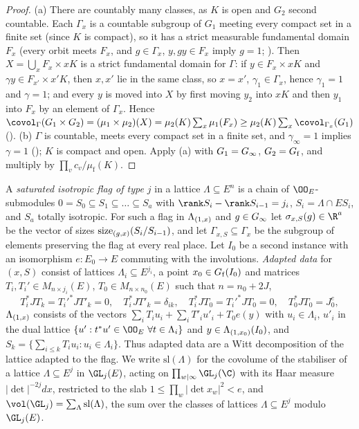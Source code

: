 \begin{proof}
(a) There are countably many classes, as $K$ is open and $G_2$ second countable. Each $\Gamma_x$ is a countable subgroup of $G_1$
meeting every compact set in a finite set (since $K$ is compact), so it has a strict measurable fundamental domain $F_x$ (every
orbit meets $F_x$, and $g\in\Gamma_x$, $y,gy\in F_x$ imply $g=1$; ). Then
$X=\bigcup_xF_x\times xK$ is a strict fundamental domain for $\Gamma$: if $y\in F_x\times xK$ and $\gamma y\in F_{x'}\times x'K$,
then $x,x'$ lie in the same class, so $x=x'$, $\gamma_1\in\Gamma_x$, hence $\gamma_1=1$ and $\gamma=1$; and every $y$ is moved into $X$
by first moving $y_2$ into $xK$ and then $y_1$ into $F_x$ by an element of $\Gamma_x$. Hence
$\covol_\Gamma(G_1\times G_2)=(\mu_1\times\mu_2)(X)=\mu_2(K)\sum_x\mu_1(F_x)\ge\mu_2(K)\sum_x\covol_{\Gamma_x}(G_1)$
().
(b) $\Gamma$ is countable, meets every compact set in a finite set, and $\gamma_\infty=1$ implies $\gamma=1$
(); $K$ is compact and open. Apply (a) with
$G_1=G_\infty$, $G_2=G_{\mathrm f}$, and multiply by $\prod_vc_v/\mu_{\mathrm f}(K)$.
\end{proof}

A \emph{saturated isotropic flag of type $j$} in a lattice $\Lambda\subseteq E^n$ is a chain of $\OO_E$-submodules
$0=S_0\subseteq S_1\subseteq\dots\subseteq S_a$ with $\rank S_i-\rank S_{i-1}=j_i$, $S_i=\Lambda\cap ES_i$, and $S_a$ totally
isotropic. For such a flag in $\Lambda_{(1,x)}$ and $g\in G_\infty$ let $\sigma_{x,S}(g)\in\R^a$ be the vector of sizes
$\operatorname{size}_{(g,x)}(S_i/S_{i-1})$, and let $\Gamma_{x,S}\subseteq\Gamma_x$ be the subgroup of elements preserving the flag at every
real place. Let $I_0$ be a second instance with an isomorphism $e:E_0\to E$ commuting with the involutions.
\emph{Adapted data} for $(x,S)$ consist of lattices $\Lambda_i\subseteq E^{j_i}$, a point $x_0\in G_{\mathrm f}(I_0)$ and matrices
$T_i,T_i'\in M_{n\times j_i}(E)$, $T_0\in M_{n\times n_0}(E)$ such that $n=n_0+2J$,
\[
T_i^*JT_k=T_i'^*JT'_k=0,\quad T_i^*JT'_k=\delta_{ik},\quad T_i^*JT_0=T_i'^*JT_0=0,\quad T_0^*JT_0=J_0^e,
\]
$\Lambda_{(1,x)}$ consists of the vectors $\sum_iT_iu_i+\sum_iT'_iu'_i+T_0e(y)$ with $u_i\in\Lambda_i$, $u'_i$ in the dual
lattice $\{u':t^*u'\in\OO_E\ \forall t\in\Lambda_i\}$ and $y\in\Lambda_{(1,x_0)}(I_0)$, and $S_k=\{\sum_{i\le k}T_iu_i:u_i\in\Lambda_i\}$.
Thus adapted data are a Witt decomposition of the lattice adapted to the flag. We write $\mathrm{sl}(\Lambda)$ for the covolume of
the stabiliser of a lattice $\Lambda\subseteq E^j$ in $\GL_j(E)$, acting on $\prod_{w\mid\infty}\GL_j(\C)$ with its Haar measure
$|\det|^{-2j}dx$, restricted to the slab $1\le\prod_w|\det x_w|^2<e$, and $\vol(\GL_j)=\sum_\Lambda\mathrm{sl}(\Lambda)$, the sum over
the classes of lattices $\Lambda\subseteq E^j$ modulo $\GL_j(E)$.

